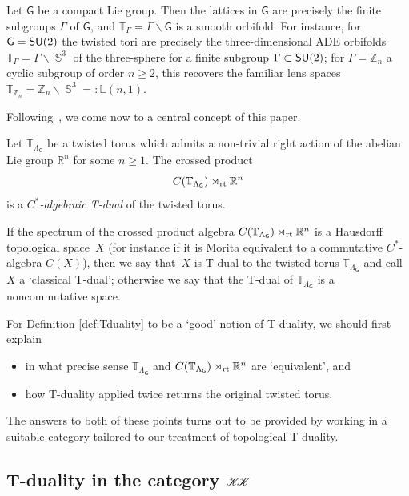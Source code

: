 \documentclass[pdftex]{sigma}
\numberwithin{equation}{section}
\DeclareMathOperator{\Sphere}{\mathbb{S}}
\newcommand{\CCK}{\mathscr{K}}
\newcommand{\sfG}{\mathsf{G}}
\newcommand{\SU}{{\sf SU}}
\newcommand{\rt}{{\rm rt}}
\newcommand{\zed}{{\mathbb Z}} %
\newcommand{\real}{{\mathbb R}} %
\newcommand{\torus}{{\mathbb T}} %
\begin{document}
\begin{Example}[orbifolds]
Let $\sfG$ be a compact Lie group. Then the lattices in $\sfG$ are
precisely the finite subgroups $\Gamma$ of $\sfG$, and
$\torus_\Gamma=\Gamma\backslash\sfG$ is a smooth orbifold. For instance,
for $\sfG=\SU(2)$ the twisted tori are precisely the three-dimensional
ADE orbifolds $\torus_\Gamma=\Gamma\backslash\Sphere^3$
of the three-sphere for a finite subgroup $\Gamma\subset\SU(2)$;
for $\Gamma=\zed_n$ a cyclic subgroup of order $n\geq2$, this recovers
the familiar lens spaces $\torus_{\zed_n}=\zed_n\backslash\Sphere^3=:\mathbb{L}(n,1)$.
\end{Example}

Following~\cite{Mathai2004}, we come now to a central concept of this paper.

\begin{Definition}\label{def:Tduality}
Let $\torus_{\Lambda_\sfG}$ be a twisted torus which admits a
non-trivial right action
of the abelian Lie group $\real^n$ for some $n\geq1$. The crossed product
\[
C(\torus_{\Lambda_\sfG})\rtimes_\rt \real^n
\]
is a \emph{$C^*$-algebraic T-dual} of the twisted torus.
\end{Definition}
If the spectrum of the crossed product algebra $
C(\torus_{\Lambda_\sfG})\rtimes_\rt \real^n
$ is a Hausdorff topological space~$X$ (for instance
if it is Morita
equivalent to a commutative $C^*$-algebra $C(X)$), then we say that~$X$ is T-dual to the
twisted torus $\torus_{\Lambda_\sfG}$ and call $X$ a `classical T-dual'; otherwise we say that the T-dual of
$\torus_{\Lambda_\sfG}$ is a noncommutative space.

For Definition \ref{def:Tduality} to be a `good' notion of T-duality, we should first explain
\begin{itemize}\itemsep=0pt
\item[(a)] in
what precise sense $\torus_{\Lambda_\sfG}$ and
$C(\torus_{\Lambda_\sfG})\rtimes_\rt\real^n$ are `equivalent', and
\item[(b)] how
T-duality applied twice returns the original twisted torus.
\end{itemize}
The answers to both of these points turns out to be provided by
working in a suitable category tailored to our treatment of
topological T-duality.

\subsection[T-duality in the category $\CCK\hspace{-1mm}\CCK$]{T-duality in the category $\CCK\hspace{-1mm}\CCK$}
\label{sec:TdualityKK}
\end{document}
